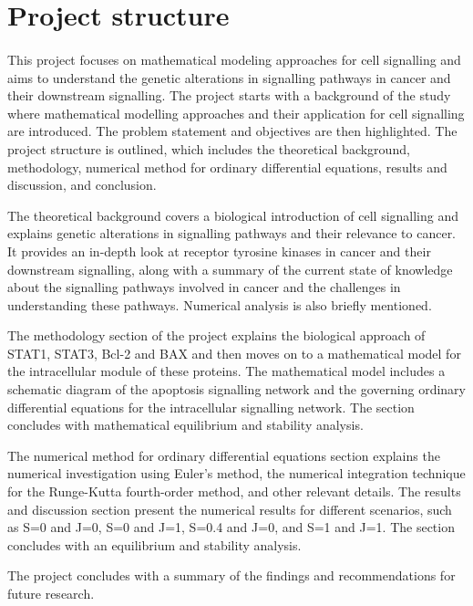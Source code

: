 \section{Project structure}
\paragraph{}

This project focuses on mathematical modeling approaches for cell signalling and aims to understand the genetic alterations in signalling pathways in cancer and their downstream signalling. The project starts with a background of the study where mathematical modelling approaches and their application for cell signalling are introduced. The problem statement and objectives are then highlighted. The project structure is outlined, which includes the theoretical background, methodology, numerical method for ordinary differential equations, results and discussion, and conclusion.

The theoretical background covers a biological introduction of cell signalling and explains genetic alterations in signalling pathways and their relevance to cancer. It provides an in-depth look at receptor tyrosine kinases in cancer and their downstream signalling, along with a summary of the current state of knowledge about the signalling pathways involved in cancer and the challenges in understanding these pathways. Numerical analysis is also briefly mentioned.

The methodology section of the project explains the biological approach of STAT1, STAT3, Bcl-2 and BAX and then moves on to a mathematical model for the intracellular module of these proteins. The mathematical model includes a schematic diagram of the apoptosis signalling network and the governing ordinary differential equations for the intracellular signalling network. The section concludes with mathematical equilibrium and stability analysis.

The numerical method for ordinary differential equations section explains the numerical investigation using Euler’s method, the numerical integration technique for the Runge-Kutta fourth-order method, and other relevant details. The results and discussion section present the numerical results for different scenarios, such as S=0 and J=0, S=0 and J=1, S=0.4 and J=0, and S=1 and J=1. The section concludes with an equilibrium and stability analysis.

The project concludes with a summary of the findings and recommendations for future research.  
\paragraph{}






































